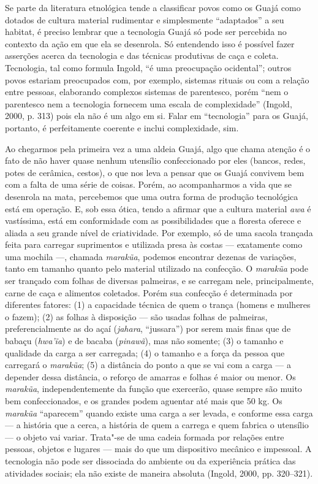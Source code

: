 Se parte da literatura etnológica tende a classificar povos como os
Guajá como dotados de cultura material rudimentar e simplesmente
``adaptados'' a seu habitat, é preciso lembrar que a tecnologia Guajá só
pode ser percebida no contexto da ação em que ela se desenrola. Só
entendendo isso é possível fazer asserções acerca da tecnologia e das
técnicas produtivas de caça e coleta. Tecnologia, tal como formula
Ingold, ``é uma preocupação ocidental''; outros povos estariam preocupados
com, por exemplo, sistemas rituais ou com a relação entre pessoas,
elaborando complexos sistemas de parentesco, porém ``nem o parentesco nem
a tecnologia fornecem uma escala de complexidade'' (Ingold, 2000, p. 313)
pois ela não é um algo em si. Falar em ``tecnologia'' para os Guajá,
portanto, é perfeitamente coerente e inclui complexidade, sim.

Ao chegarmos pela primeira vez a uma aldeia Guajá, algo que chama
atenção é o fato de não haver quase nenhum utensílio confeccionado por
eles (bancos, redes, potes de cerâmica, cestos), o que nos leva a pensar
que os Guajá convivem bem com a falta de uma série de coisas. Porém, ao
acompanharmos a vida que se desenrola na mata, percebemos que uma outra
forma de produção tecnológica está em operação. E, sob essa ótica, tendo
a afirmar que a cultura material \emph{awa} é vastíssima, está em
conformidade com as possibilidades que a floresta oferece e aliada a seu
grande nível de criatividade. Por exemplo, só de uma sacola trançada
feita para carregar suprimentos e utilizada presa às costas --- exatamente
como uma mochila ---, chamada \emph{marakũa}, podemos encontrar dezenas de
variações, tanto em tamanho quanto pelo material utilizado na confecção.
O \emph{marakũa} pode ser trançado com folhas de diversas palmeiras, e
se carregam nele, principalmente, carne de caça e alimentos coletados.
Porém sua confecção é determinada por diferentes fatores: (1) a
capacidade técnica de quem o trança (homens e mulheres o fazem); (2) as
folhas à disposição --- são usadas folhas de palmeiras, preferencialmente
as do açaí (\emph{jahara}, ``jussara'') por serem mais finas que de babaçu
(\emph{hwa'ĩa}) e de bacaba (\emph{pinawã}), mas não somente; (3) o
tamanho e qualidade da carga a ser carregada; (4) o tamanho e a força da
pessoa que carregará o \emph{marakũa}; (5) a distância do ponto a que se
vai com a carga --- a depender dessa distância, o reforço de amarras e
folhas é maior ou menor. Os \emph{marakũa}, independentemente da função
que exercerão, quase sempre são muito bem confeccionados, e os grandes
podem aguentar até mais que 50 kg. Os \emph{marakũa} ``aparecem'' quando
existe uma carga a ser levada, e conforme essa carga --- a história que a
cerca, a história de quem a carrega e quem fabrica o utensílio --- o
objeto vai variar. Trata"-se de uma cadeia formada por relações entre
pessoas, objetos e lugares --- mais do que um dispositivo mecânico e
impessoal. A tecnologia não pode ser dissociada do ambiente ou da
experiência prática das atividades sociais; ela não existe de maneira
absoluta (Ingold, 2000, pp. 320--321).

